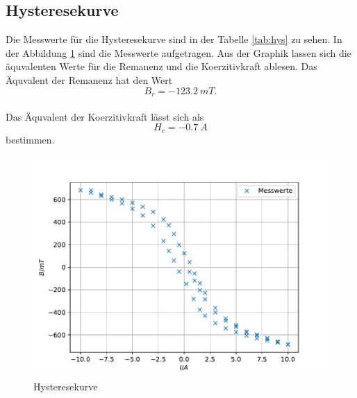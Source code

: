 \subsection{Hysteresekurve}
Die Messwerte für die Hysteresekurve sind in der Tabelle \ref{tab:hys} zu sehen.
In der Abbildung \ref{fig:hyst} sind die Messwerte aufgetragen.
Aus der Graphik lassen sich die äquvalenten Werte für die Remanenz und die Koerzitivkraft ablesen.
Das Äquvalent der Remanenz hat den Wert
\begin{equation*}
  B_r = \SI{-123.2}{mT}.
\end{equation*}
\\Das Äquvalent der Koerzitivkraft lässt sich als
\begin{equation*}
  H_c = \SI{-0,7}{A}
\end{equation*}
bestimmen.

\begin{figure}[h!]
  \centering
  \includegraphics[width=\textwidth]{hysterese.pdf}
  \caption{Hysteresekurve}
  \label{fig:hyst}
\end{figure}
\FloatBarrier
